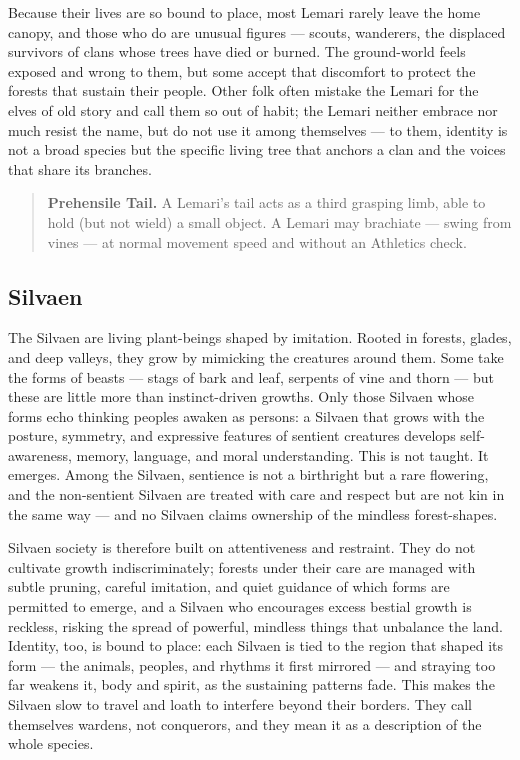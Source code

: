 Because their lives are so bound to place, most Lemari rarely leave the home canopy, and those who do are unusual figures --- scouts, wanderers, the displaced survivors of clans whose trees have died or burned. The ground-world feels exposed and wrong to them, but some accept that discomfort to protect the forests that sustain their people. Other folk often mistake the Lemari for the elves of old story and call them so out of habit; the Lemari neither embrace nor much resist the name, but do not use it among themselves --- to them, identity is not a broad species but the specific living tree that anchors a clan and the voices that share its branches.

\begin{quote}
\textbf{Prehensile Tail.} A Lemari's tail acts as a third grasping limb, able to hold (but not wield) a small object. A Lemari may brachiate --- swing from vines --- at normal movement speed and without an Athletics check.
\end{quote}

\subsection{Silvaen}

The Silvaen are living plant-beings shaped by imitation. Rooted in forests, glades, and deep valleys, they grow by mimicking the creatures around them. Some take the forms of beasts --- stags of bark and leaf, serpents of vine and thorn --- but these are little more than instinct-driven growths. Only those Silvaen whose forms echo thinking peoples awaken as persons: a Silvaen that grows with the posture, symmetry, and expressive features of sentient creatures develops self-awareness, memory, language, and moral understanding. This is not taught. It emerges. Among the Silvaen, sentience is not a birthright but a rare flowering, and the non-sentient Silvaen are treated with care and respect but are not kin in the same way --- and no Silvaen claims ownership of the mindless forest-shapes.

Silvaen society is therefore built on attentiveness and restraint. They do not cultivate growth indiscriminately; forests under their care are managed with subtle pruning, careful imitation, and quiet guidance of which forms are permitted to emerge, and a Silvaen who encourages excess bestial growth is reckless, risking the spread of powerful, mindless things that unbalance the land. Identity, too, is bound to place: each Silvaen is tied to the region that shaped its form --- the animals, peoples, and rhythms it first mirrored --- and straying too far weakens it, body and spirit, as the sustaining patterns fade. This makes the Silvaen slow to travel and loath to interfere beyond their borders. They call themselves wardens, not conquerors, and they mean it as a description of the whole species.

